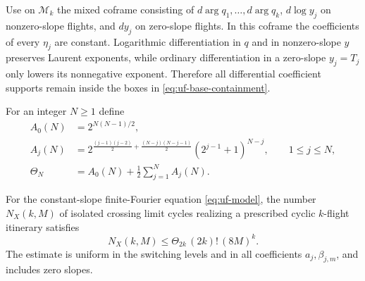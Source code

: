 Use on $\mathcal M_k$ the mixed coframe consisting of $d\arg q_1,\ldots,
d\arg q_k$, $d\log y_j$ on nonzero-slope flights, and $dy_j$ on zero-slope
flights.  In this coframe the coefficients of every $\eta_j$ are constant.
Logarithmic differentiation in $q$ and in nonzero-slope $y$ preserves Laurent
exponents, while ordinary differentiation in a zero-slope $y_j=T_j$ only lowers
its nonnegative exponent.  Therefore all differential coefficient supports
remain inside the boxes in \eqref{eq:uf-base-containment}.

For an integer $N\ge1$ define
\begin{align}
 A_0(N)&=2^{N(N-1)/2},\label{eq:uf-A0}\\
 A_j(N)&=
 2^{\frac{(j-1)(j-2)}2+\frac{(N-j)(N-j-1)}2}
 (2^{j-1}+1)^{N-j},\qquad 1\le j\le N,\label{eq:uf-Aj}\\
 \Theta_N&=A_0(N)+\frac12\sum_{j=1}^{N}A_j(N).
 \label{eq:uf-Theta}
\end{align}

\begin{theorem}
\label{thm:uf-fixed-itinerary}
For the constant-slope finite-Fourier equation \eqref{eq:uf-model}, the number
$N_X(k,M)$ of isolated crossing limit cycles realizing a prescribed cyclic
$k$-flight itinerary satisfies
\begin{equation}\label{eq:uf-fixed-bound}
 \boxed{
 N_X(k,M)\le
 \Theta_{2k}\,(2k)!\,(8M)^k.}
\end{equation}
The estimate is uniform in the switching levels and in all coefficients
$a_j,\beta_{j,m}$, and includes zero slopes.
\end{theorem}


